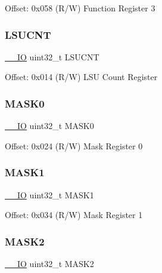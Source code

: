 Offset\+: 0x058 (R/W) Function Register 3 \mbox{\label{struct_d_w_t___type_ab1d62b8e1a69bead9717d5a02f741811}} 
\subsubsection{\texorpdfstring{L\+S\+U\+C\+NT}{LSUCNT}}
{\footnotesize\ttfamily \mbox{\hyperlink{core__cm3_8h_aec43007d9998a0a0e01faede4133d6be}{\+\_\+\+\_\+\+IO}} uint32\+\_\+t L\+S\+U\+C\+NT}

Offset\+: 0x014 (R/W) L\+SU Count Register \mbox{\label{struct_d_w_t___type_ab3f06e2cb3a76edc6f3fc90af88671ba}} 
\subsubsection{\texorpdfstring{M\+A\+S\+K0}{MASK0}}
{\footnotesize\ttfamily \mbox{\hyperlink{core__cm3_8h_aec43007d9998a0a0e01faede4133d6be}{\+\_\+\+\_\+\+IO}} uint32\+\_\+t M\+A\+S\+K0}

Offset\+: 0x024 (R/W) Mask Register 0 \mbox{\label{struct_d_w_t___type_ad55962dd61d94bd029f6927adc48bc31}} 
\subsubsection{\texorpdfstring{M\+A\+S\+K1}{MASK1}}
{\footnotesize\ttfamily \mbox{\hyperlink{core__cm3_8h_aec43007d9998a0a0e01faede4133d6be}{\+\_\+\+\_\+\+IO}} uint32\+\_\+t M\+A\+S\+K1}

Offset\+: 0x034 (R/W) Mask Register 1 \mbox{\label{struct_d_w_t___type_a860e7bcdcf674491835d91189bda3c61}} 
\subsubsection{\texorpdfstring{M\+A\+S\+K2}{MASK2}}
{\footnotesize\ttfamily \mbox{\hyperlink{core__cm3_8h_aec43007d9998a0a0e01faede4133d6be}{\+\_\+\+\_\+\+IO}} uint32\+\_\+t M\+A\+S\+K2}


